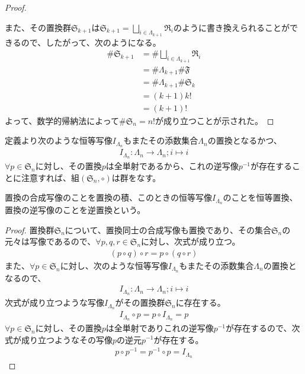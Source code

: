 \documentclass[dvipdfmx]{jsarticle}
\begin{document}
\begin{proof}
\begin{center}
\begin{tikzpicture}[auto]
  \end{tikzpicture} 
\end{center}
また、その置換群$\mathfrak{S}_{k + 1}$は$\mathfrak{S}_{k + 1} = \bigsqcup_{i \in \varLambda_{k + 1}} \mathfrak{R}_{i}$のように書き換えられることができるので、したがって、次のようになる。
\begin{align*}
{\#}\mathfrak{S}_{k + 1} &= {\#}{\bigsqcup_{i \in \varLambda_{k + 1}} \mathfrak{R}_{i}}\\
&= {\#}\varLambda_{k + 1}{\#}\mathfrak{F}\\
&= {\#}\varLambda_{k + 1}{\#}\mathfrak{S}_{k}\\
&= (k + 1)k!\\
&= (k + 1)!
\end{align*}
よって、数学的帰納法によって${\#}\mathfrak{S}_{n} = n!$が成り立つことが示された。
\end{proof}
\begin{thm}\label{2.1.10.2}
定義より次のような恒等写像$I_{\varLambda_{n}}$もまたその添数集合$\varLambda_{n}$の置換となるかつ、
\begin{align*}
I_{\varLambda_{n}}:\varLambda_{n} \rightarrow \varLambda_{n};i \mapsto i
\end{align*}
$\forall p \in \mathfrak{S}_{n}$に対し、その置換$p$は全単射であるから、これの逆写像$p^{- 1}$が存在することに注意すれば、組$\left( \mathfrak{S}_{n}, \circ \right)$は群をなす。
\end{thm}
\begin{dfn}
置換の合成写像のことを置換の積、このときの恒等写像$I_{\varLambda_{n}}$のことを恒等置換、置換の逆写像のことを逆置換という。
\end{dfn}
\begin{proof}
置換群$\mathfrak{S}_{n}$について、置換同士の合成写像も置換であり、その集合$\mathfrak{S}_{n}$の元々は写像であるので、$\forall p,q,r \in \mathfrak{S}_{n}$に対し、次式が成り立つ。
\begin{align*}
(p \circ q) \circ r = p \circ (q \circ r)
\end{align*}
また、$\forall p \in \mathfrak{S}_{n}$に対し、次のような恒等写像$I_{\varLambda_{n}}$もまたその添数集合$\varLambda_{n}$の置換となるので、
\begin{align*}
I_{\varLambda_{n}}:\varLambda_{n} \rightarrow \varLambda_{n};i \mapsto i
\end{align*}
次式が成り立つような写像$I_{\varLambda_{n}}$がその置換群$\mathfrak{S}_{n}$に存在する。
\begin{align*}
I_{\varLambda_{n}} \circ p = p \circ I_{\varLambda_{n}} = p
\end{align*}
$\forall p \in \mathfrak{S}_{n}$に対し、その置換$p$は全単射でありこれの逆写像$p^{- 1}$が存在するので、次式が成り立つようなその写像$p$の逆元$p^{- 1}$が存在する。
\begin{align*}
p \circ p^{- 1} = p^{- 1} \circ p = I_{\varLambda_{n}}
\end{align*}
\end{proof}
\end{document}
